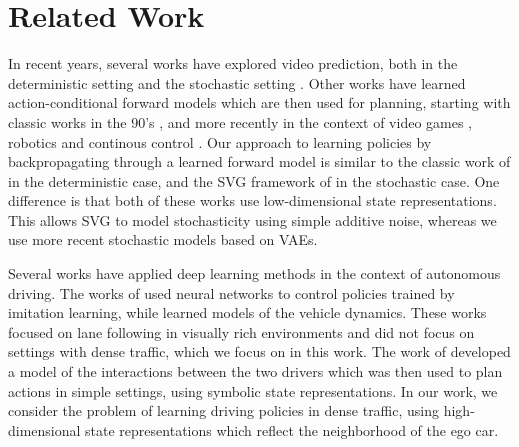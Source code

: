 \documentclass{article} %
\begin{document}
\section{Related Work}

In recent years, several works have explored video prediction, both in the deterministic setting \citep{VPN,Srivastava15,DentonB17} and the stochastic setting \citep{mathieu-iclr-2016, Villegas17, Babaeizadeh2018, Denton2018}.
Other works have learned action-conditional forward models which are then used for planning, starting with classic works in the 90's \citep{Nguyen1990, Schmidhuber1990, Jordan1992}, and more recently in the context of video games \citep{Oh15, Pascanu17, I2A}, robotics and continous control \citep{FinnGL16, Poke, Nagabandi2017, UPN}. Our approach to learning policies by backpropagating through a learned forward model is similar to the classic work of \citep{Nguyen1989} in the deterministic case, and the SVG framework of \citep{SVG} in the stochastic case. One difference is that both of these works use low-dimensional state representations. This allows SVG to model stochasticity using simple additive noise, whereas we use more recent stochastic models based on VAEs.

Several works have applied deep learning methods in the context of autonomous driving. The works of \citep{Pomerleau91, Bojarski16, Pan17} used neural networks to control policies trained by imitation learning, while \citep{Williams2017} learned models of the vehicle dynamics. These works focused on lane following in visually rich environments and did not focus on settings with dense traffic, which we focus on in this work. The work of \citep{Sadigh16} developed a model of the interactions between the two drivers which was then used to plan actions in simple settings, using symbolic state representations. In our work, we consider the problem of learning driving policies in dense traffic, using high-dimensional state representations which reflect the neighborhood of the ego car. %


\end{document}
